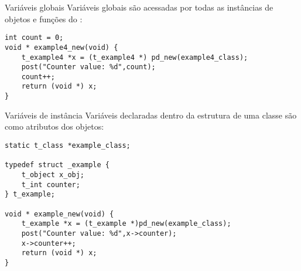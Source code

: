 \begin{frame}[fragile]{Variáveis globais}
Variáveis globais são acessadas por todas as instâncias de objetos e funções
do \external:
\begin{lstlisting}
int count = 0;
void * example4_new(void) {
    t_example4 *x = (t_example4 *) pd_new(example4_class);
    post("Counter value: %d",count);
    count++;
    return (void *) x;
}
\end{lstlisting}
\end{frame}


\begin{frame}[fragile]{Variáveis de instância}
Variáveis declaradas dentro da estrutura de uma classe são como atributos dos
objetos:
\begin{lstlisting}
static t_class *example_class;

typedef struct _example {
    t_object x_obj;
    t_int counter;
} t_example;

void * example_new(void) {
    t_example *x = (t_example *)pd_new(example_class);
    post("Counter value: %d",x->counter);
    x->counter++;
    return (void *) x;
}
\end{lstlisting}
\end{frame}

